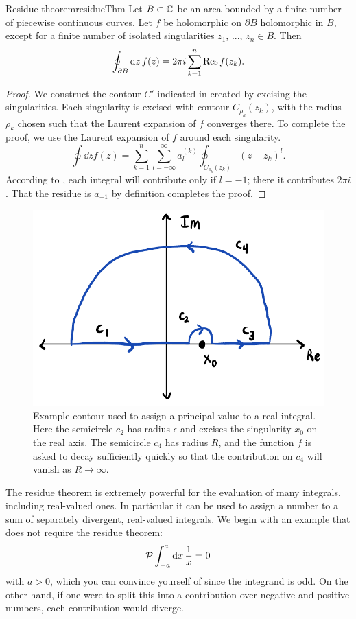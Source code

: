 \begin{theorem}{Residue theorem}{residueThm}
Let $B\subset\mathbb{C}$ be an area bounded by a finite number of piecewise
continuous curves. Let $f$ be holomorphic on $\partial B$ 
holomorphic in $B$, except for a finite number of isolated 
singularities $z_1$, ..., $z_n\in B$. Then
$$
\oint_{\partial B}\dd{z}f(z)=2\pi i\sum_{k=1}^n\Res f(z_k).
$$
\begin{proof}
We construct the contour $C'$ indicated in 
created by excising the singularities. Each singularity is
excised with contour $\overline{C}_{\rho_k}(z_k)$, with the
radius $\rho_k$ chosen such that the Laurent expansion
of $f$ converges there. To complete the proof, we use the Laurent
expansion of $f$ around each singularity.
\begin{equation*}
  \oint\dd{z}f(z)=\sum_{k=1}^n\sum_{l=-\infty}^\infty 
                    a_l^{(k)}\oint_{C_{\rho_k}(z_k)}(z-z_k)^l.
\end{equation*}
According to , each integral will contribute 
only if $l=-1$; there it contributes $2\pi i$. That the residue is
$a_{-1}$ by definition completes the proof.
\end{proof}
\end{theorem}

\begin{figure}
\centering
\includegraphics[width=0.75\linewidth]{figs/principal_value-cropped.pdf}
\caption{Example contour used to assign a principal value to a real integral.
Here the semicircle $c_2$ has radius $\epsilon$ and excises the singularity
$x_0$ on the real axis. The semicircle $c_4$ has radius $R$, and the function 
$f$ is asked to decay sufficiently quickly so that the contribution on 
$c_4$ will vanish as $R\to\infty$.}
\label{fig:principalValue}
\end{figure}

The residue theorem is extremely powerful for the evaluation of many integrals,
including real-valued ones. In particular it can be used to assign a number to
a sum of separately divergent, real-valued integrals. 
We begin with an example 
that does not require the residue theorem:
\begin{equation}\label{eq:principalEasy}
  \mathcal{P}\int_{-a}^a\dd{x}\frac{1}{x}=0
\end{equation} 
with $a>0$, which you can convince yourself of since the integrand is odd. On
the other hand, if one were to split this into a contribution over negative and
positive numbers, each contribution would diverge.

